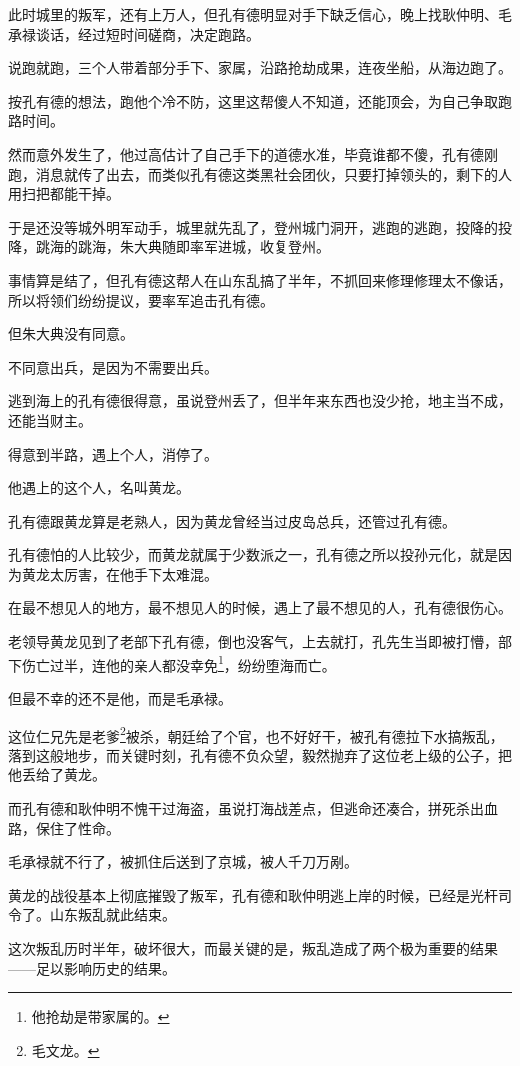 \begin{multicols}{\theparacolNo}
		此时城里的叛军，还有上万人，但孔有德明显对手下缺乏信心，晚上找耿仲明、毛承禄谈话，经过短时间磋商，决定跑路。

		说跑就跑，三个人带着部分手下、家属，沿路抢劫成果，连夜坐船，从海边跑了。

		按孔有德的想法，跑他个冷不防，这里这帮傻人不知道，还能顶会，为自己争取跑路时间。

		然而意外发生了，他过高估计了自己手下的道德水准，毕竟谁都不傻，孔有德刚跑，消息就传了出去，而类似孔有德这类黑社会团伙，只要打掉领头的，剩下的人用扫把都能干掉。

		于是还没等城外明军动手，城里就先乱了，登州城门洞开，逃跑的逃跑，投降的投降，跳海的跳海，朱大典随即率军进城，收复登州。

		事情算是结了，但孔有德这帮人在山东乱搞了半年，不抓回来修理修理太不像话，所以将领们纷纷提议，要率军追击孔有德。

		但朱大典没有同意。

		不同意出兵，是因为不需要出兵。

		逃到海上的孔有德很得意，虽说登州丢了，但半年来东西也没少抢，地主当不成，还能当财主。

		得意到半路，遇上个人，消停了。

		他遇上的这个人，名叫黄龙。

		孔有德跟黄龙算是老熟人，因为黄龙曾经当过皮岛总兵，还管过孔有德。

		孔有德怕的人比较少，而黄龙就属于少数派之一，孔有德之所以投孙元化，就是因为黄龙太厉害，在他手下太难混。

		在最不想见人的地方，最不想见人的时候，遇上了最不想见的人，孔有德很伤心。

		老领导黄龙见到了老部下孔有德，倒也没客气，上去就打，孔先生当即被打懵，部下伤亡过半，连他的亲人都没幸免\footnote{他抢劫是带家属的。}，纷纷堕海而亡。

		但最不幸的还不是他，而是毛承禄。

		这位仁兄先是老爹\footnote{毛文龙。}被杀，朝廷给了个官，也不好好干，被孔有德拉下水搞叛乱，落到这般地步，而关键时刻，孔有德不负众望，毅然抛弃了这位老上级的公子，把他丢给了黄龙。

		而孔有德和耿仲明不愧干过海盗，虽说打海战差点，但逃命还凑合，拼死杀出血路，保住了性命。

		毛承禄就不行了，被抓住后送到了京城，被人千刀万剐。

		黄龙的战役基本上彻底摧毁了叛军，孔有德和耿仲明逃上岸的时候，已经是光杆司令了。山东叛乱就此结束。

		这次叛乱历时半年，破坏很大，而最关键的是，叛乱造成了两个极为重要的结果——足以影响历史的结果。


\end{multicols}

